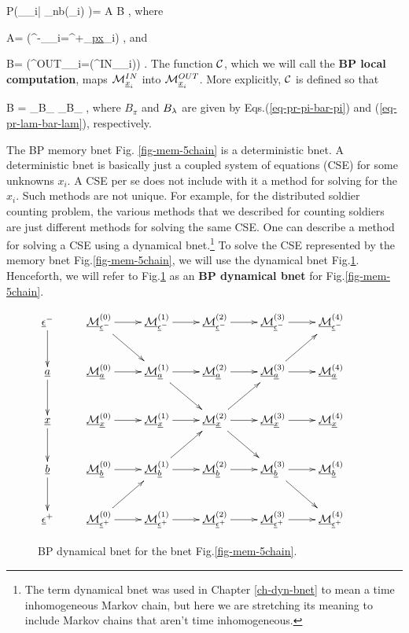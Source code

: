 \beq\color{blue}
P(\calm_{\rvx_i}|
\calm_{\rvn\in nb(\rvx_i)}
)= A B
\;,
\eeq
where

\beq
A=
\indi(\calm^{-}_{\rvx_i}=\calm^{+}_{\ul{px}_i})
\;,
\eeq
and

\beq
B=
\indi(\calm^{OUT}_{\rvx_i}=\calc(\calm^{IN}_{\rvx_i}))
\label{eq-mp-update-static}
\;.
\eeq
The function ${\cal C}$,
which 
we will call the {\bf BP local computation},
maps ${\cal M}^{IN}_{{\underline{x}}_i}$
into ${\cal M}^{OUT}_{{\underline{x}}_i}$. More explicitly,
${\cal C}$ is defined so that

\beq
B
=
_{B_\pi}
_{B_\pi}
\;,
\eeq
where
$B_\pi$ and $B_\lambda$
are given by Eqs.(\ref{eq-pr-pi-bar-pi})
and (\ref{eq-pr-lam-bar-lam}),
respectively.



The BP memory bnet
 Fig.
\ref{fig-mem-5chain}
is a deterministic bnet.
A deterministic bnet
is basically
just a coupled system
of equations (CSE)
for some unknowns $x_i$. 
A CSE per se does not
include with it a method for  
solving for the $x_i$. Such methods are not
unique.
For example,
for the 
distributed
soldier counting 
problem,
the various 
methods that
we described
for counting soldiers
are just different
methods 
for solving the same
CSE.
One can describe 
a method for solving a
CSE using a dynamical bnet.\footnote{
The term
dynamical bnet
was used in Chapter \ref{ch-dyn-bnet}
to mean a time inhomogeneous
Markov chain, but 
here we are stretching its meaning to
include
Markov chains
that aren't 
time inhomogeneous.}
To solve
the CSE
represented by
the memory bnet Fig.\ref{fig-mem-5chain},
we will use the 
dynamical bnet
Fig.\ref{fig-propagation-5chain}.
Henceforth, 
we will refer to
Fig.\ref{fig-propagation-5chain} as
an {\bf BP dynamical bnet}
for Fig.\ref{fig-mem-5chain}.

\begin{figure}
$$\xymatrix{
\rveps^-\ar[d]
&\ucalm^{(0)}_{\rveps^-}\ar[r]\ar[dr]
&\ucalm^{(1)}_{\rveps^-}\ar[r]
&\ucalm^{(2)}_{\rveps^-}\ar[r]
&\ucalm^{(3)}_{\rveps^-}\ar[r]
&\ucalm^{(4)}_{\rveps^-}
&
\\
\rva\ar[d]
&\ucalm^{(0)}_{\rva}\ar[r]
&\ucalm^{(1)}_{\rva}\ar[r]\ar[dr]
&\ucalm^{(2)}_{\rva}\ar[r]
&\ucalm^{(3)}_{\rva}\ar[r]\ar[ur]
&\ucalm^{(4)}_{\rva}
\\
\rvx\ar[d]
&\ucalm^{(0)}_{\rvx}\ar[r]
&\ucalm^{(1)}_{\rvx}\ar[r]
&\ucalm^{(2)}_{\rvx}\ar[r]\ar[dr]\ar[ur]
&\ucalm^{(3)}_{\rvx}\ar[r]
&\ucalm^{(4)}_{\rvx}
\\
\rvb\ar[d]
&\ucalm^{(0)}_{\rvb}\ar[r]
&\ucalm^{(1)}_{\rvb}\ar[r]\ar[ur]
&\ucalm^{(2)}_{\rvb}\ar[r]
&\ucalm^{(3)}_{\rvb}\ar[r]\ar[dr]
&\ucalm^{(4)}_{\rvb}
\\
\rveps^+
&\ucalm^{(0)}_{\rveps^+}\ar[r]\ar[ur]
&\ucalm^{(1)}_{\rveps^+}\ar[r]
&\ucalm^{(2)}_{\rveps^+}\ar[r]
&\ucalm^{(3)}_{\rveps^+}\ar[r]
&\ucalm^{(4)}_{\rveps^+}
}$$
\caption{BP dynamical bnet for the bnet
  Fig.\ref{fig-mem-5chain}.}
\label{fig-propagation-5chain}
\end{figure}

